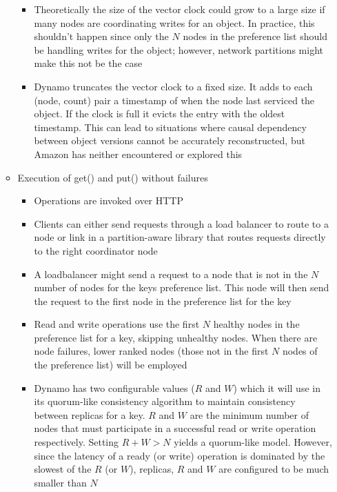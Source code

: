 \documentclass[a4paper]{article}
\begin{document}
\begin{itemize}
\begin{itemize}
\begin{itemize}
\item Theoretically the size of the vector clock could grow to a large size if many nodes are coordinating writes for an object. In practice, this shouldn't happen since only the $N$ nodes in the preference list should be handling writes for the object; however, network partitions might make this not be the case

\item Dynamo truncates the vector clock to a fixed size. It adds to each (node, count) pair a timestamp of when the node last serviced the object. If the clock is full it evicts the entry with the oldest timestamp. This can lead to situations where causal dependency between object versions cannot be accurately reconstructed, but Amazon has neither encountered or explored this
\end{itemize}

\item Execution of get() and put() without failures
\begin{itemize}
\item Operations are invoked over HTTP

\item Clients can either send requests through a load balancer to route to a node or link in a partition-aware library that routes requests directly to the right coordinator node

\item A loadbalancer might send a request to a node that is not in the $N$ number of nodes for the keys preference list. This node will then send the request to the first node in the preference list for the key

\item Read and write operations use the first $N$ healthy nodes in the preference list for a key, skipping unhealthy nodes. When there are node failures, lower ranked nodes (those not in the first $N$ nodes of the preference list) will be employed

\item Dynamo has two configurable values ($R$ and $W$) which it will use in its quorum-like consistency algorithm to maintain consistency between replicas for a key. $R$ and $W$ are the minimum number of nodes that must participate in a successful read or write operation respectively. Setting $R + W > N$ yields a quorum-like model. However, since the latency of a ready (or write) operation is dominated by the slowest of the $R$ (or $W$), replicas, $R$ and $W$ are configured to be much smaller than $N$


\end{itemize}
\end{itemize}
\end{itemize}
\end{document}
